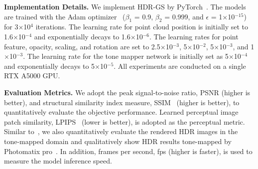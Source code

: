 \documentclass{article}
\begin{document}
\noindent\textbf{Implementation Details.} We implement HDR-GS by PyTorch~\cite{pytorch}. The models are trained with the Adam optimizer~\cite{adam} ($\beta_1$ = 0.9, $\beta_2$ = 0.999, and $\epsilon$ = 1$\times$10$^{-15}$) for 3$\times$10$^{4}$ iterations. The learning rate for point cloud position is initially set to 1.6$\times$10$^{-4}$ and exponentially decays to 1.6$\times$10$^{-6}$. The learning rates for point feature, opacity, scaling, and rotation are set to 2.5$\times$10$^{-3}$, 5$\times$10$^{-2}$, 5$\times$10$^{-3}$, and 1$\times$10$^{-3}$. The learning rate for the tone mapper network is initially set as 5$\times$10$^{-4}$ and exponentially decays to 5$\times$10$^{-5}$. All experiments are conducted on a single RTX A5000 GPU.%

\noindent\textbf{Evaluation Metrics.} We adopt the peak signal-to-noise ratio, PSNR (higher is better), and structural similarity index measure, SSIM~\cite{ssim} (higher is better), to quantitatively evaluate the objective performance. Learned perceptual image patch similarity, LPIPS~\cite{lpips} (lower is better), is adopted as the perceptual metric. Similar to~\cite{hdr_nerf}, we also quantitatively evaluate the rendered HDR images in the tone-mapped domain and qualitatively show HDR results tone-mapped by Photomatix pro~\cite{photomatix}. In addition, frames per second, fps (higher is faster), is used to measure the model inference speed. 
\end{document}
